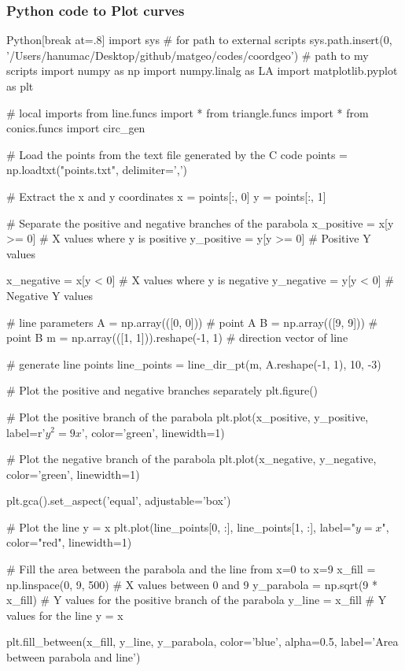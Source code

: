 \documentclass{beamer}
\theoremstyle{remark}
\numberwithin{equation}{section}
\begin{document}
\begin{frame}
  \frametitle{Python code to Plot curves}
  \begin{mintedbox}{Python}[break at=.8\textheight]
    import sys  # for path to external scripts
sys.path.insert(0, '/Users/hanumac/Desktop/github/matgeo/codes/coordgeo')  # path to my scripts
import numpy as np
import numpy.linalg as LA
import matplotlib.pyplot as plt

# local imports
from line.funcs import *
from triangle.funcs import *
from conics.funcs import circ_gen

# Load the points from the text file generated by the C code
points = np.loadtxt("points.txt", delimiter=',')

# Extract the x and y coordinates
x = points[:, 0]
y = points[:, 1]

# Separate the positive and negative branches of the parabola
x_positive = x[y >= 0]  # X values where y is positive
y_positive = y[y >= 0]  # Positive Y values

x_negative = x[y < 0]   # X values where y is negative
y_negative = y[y < 0]   # Negative Y values

# line parameters
A = np.array(([0, 0]))  # point A
B = np.array(([9, 9]))  # point B
m = np.array(([1, 1])).reshape(-1, 1)  # direction vector of line

# generate line points
line_points = line_dir_pt(m, A.reshape(-1, 1), 10, -3)

# Plot the positive and negative branches separately
plt.figure()

# Plot the positive branch of the parabola
plt.plot(x_positive, y_positive, label=r'$y^2 = 9x$', color='green', linewidth=1)

# Plot the negative branch of the parabola
plt.plot(x_negative, y_negative, color='green', linewidth=1)

plt.gca().set_aspect('equal', adjustable='box')

# Plot the line y = x
plt.plot(line_points[0, :], line_points[1, :], label="$ y = x $", color="red", linewidth=1)

# Fill the area between the parabola and the line from x=0 to x=9
x_fill = np.linspace(0, 9, 500)  # X values between 0 and 9
y_parabola = np.sqrt(9 * x_fill)  # Y values for the positive branch of the parabola
y_line = x_fill  # Y values for the line y = x

plt.fill_between(x_fill, y_line, y_parabola, color='blue', alpha=0.5, label='Area between parabola and line')


\end{mintedbox}
\end{frame}
\end{document}
